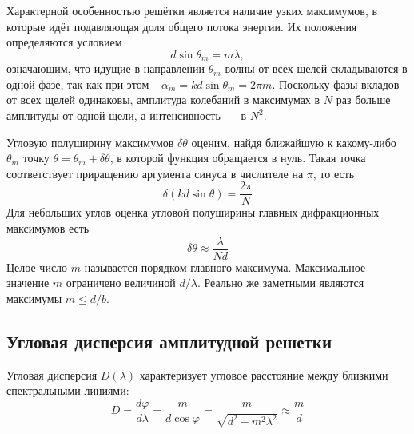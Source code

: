 \begin{figure}[ht!]
\end{figure}

Характерной особенностью решётки является наличие узких максимумов, в которые идёт подавляющая доля общего потока энергии. Их положения определяются условием
\[
d\sin\theta_m = m\lambda,
\]
означающим, что идущие в направлении $\theta_m$ волны от всех щелей складываются в одной фазе, так как при этом $-\alpha_m = kd\sin\theta_m = 2\pi m$. Поскольку фазы вкладов от всех щелей одинаковы, амплитуда колебаний в максимумах в $N$ раз больше амплитуды от одной щели, а интенсивность~--- в $N^2$.

Угловую полуширину максимумов $\delta\theta$ оценим, найдя ближайшую к  какому-либо $\theta_m$ точку $\theta = \theta_m + \delta\theta$, в которой функция обращается в нуль. Такая точка соответствует приращению аргумента синуса в числителе на $\pi$, то есть
\[
\delta(kd\sin\theta) = \frac{2\pi}{N}
\]
Для небольших углов оценка угловой полуширины главных дифракционных максимумов есть
\[
\delta\theta \approx \frac{\lambda}{Nd}
\]
Целое число $m$ называется порядком главного максимума. Максимальное значение $m$ ограничено величиной $d / \lambda$. Реально же заметными являются максимумы $m \le d / b$.

\subsection{Угловая дисперсия амплитудной решетки}
Угловая дисперсия $D(\lambda)$ характеризует угловое расстояние между близкими спектральными линиями:
\[
    D = \frac{d\varphi}{d\lambda} = \frac{m}{d\cos\varphi}=\frac{m}{\sqrt{d^2-m^2\lambda^2}}\approx \frac{m}{d}
\]

